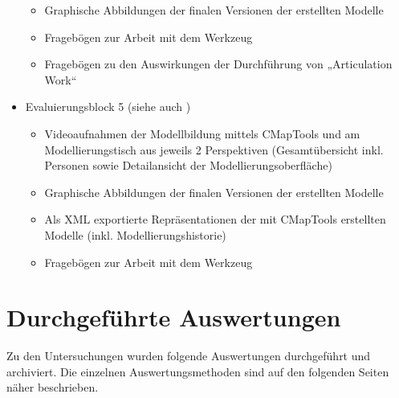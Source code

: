 \begin{itemize}
\begin{itemize}
			\item Graphische Abbildungen der finalen Versionen der erstellten Modelle
			\item Fragebögen zur Arbeit mit dem Werkzeug
			\item Fragebögen zu den Auswirkungen der Durchführung von „Articulation Work“
		\end{itemize}
	\item Evaluierungsblock 5 (siehe auch \citep{Bindreiter10})
		\begin{itemize}
			\item Videoaufnahmen der Modellbildung mittels CMapTools und am Modellierungstisch aus jeweils 2 Perspektiven (Gesamtübersicht inkl. Personen sowie Detailansicht der Modellierungsoberfläche)
			\item Graphische Abbildungen der finalen Versionen der erstellten Modelle
			\item Als XML exportierte Repräsentationen der mit CMapTools erstellten Modelle (inkl. Modellierungshistorie)
			\item Fragebögen zur Arbeit mit dem Werkzeug
		\end{itemize}
\end{itemize}


\section{Durchgeführte Auswertungen} %
\label{sec:durchgeführte_auswertungen}

Zu den Untersuchungen wurden folgende Auswertungen durchgeführt und archiviert. Die einzelnen Auswertungsmethoden sind auf den folgenden Seiten näher beschrieben.

